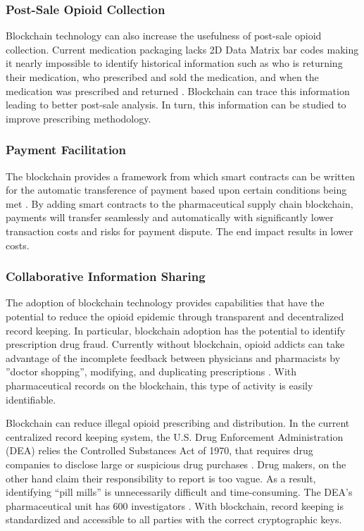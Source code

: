 \documentclass[sigconf]{acmart}
\begin{document}
\subsubsection{Post-Sale Opioid Collection} Blockchain technology can also increase the usefulness of post-sale opioid collection. Current medication packaging lacks 2D Data Matrix bar codes making it nearly impossible to identify historical information such as who is returning their medication, who prescribed and sold the medication, and when the medication was prescribed and returned \cite{Walles01}. Blockchain can trace this information leading to better post-sale analysis. In turn, this information can be studied to improve prescribing methodology.

\subsubsection{Payment Facilitation} The blockchain provides a framework from which smart contracts can be written for the automatic transference of payment based upon certain conditions being met \cite{hbr} \cite{tapscott}. By adding smart contracts to the pharmaceutical supply chain blockchain, payments will transfer seamlessly and automatically with significantly lower transaction costs and risks for payment dispute. The end impact results in lower costs.  

\subsubsection{Collaborative Information Sharing} The adoption of block\-chain technology provides capabilities that have the potential to reduce the opioid epidemic through transparent and decentralized record keeping. In particular, blockchain adoption has the potential to identify prescription drug fraud. Currently without blockchain, opioid addicts can take advantage of the incomplete feedback between physicians and pharmacists by ''doctor shopping'', modifying, and duplicating prescriptions \cite{hitchingHealthcare}. With pharmaceutical records on the blockchain, this type of activity is easily identifiable. 

Blockchain can reduce illegal opioid prescribing and distribution. In the current centralized record keeping system, the U.S. Drug Enforcement Administration (DEA) relies the Controlled Substances Act of 1970, that requires drug companies to disclose large or suspicious drug purchases \cite{Higham01}. Drug makers, on the other hand claim their responsibility to report is too vague.  As a result, identifying ``pill mills'' is unnecessarily difficult and time-consuming. The DEA's pharmaceutical unit has 600 investigators \cite{Higham01}. With blockchain, record keeping is standardized and accessible to all parties with the correct cryptographic keys.
\end{document}

